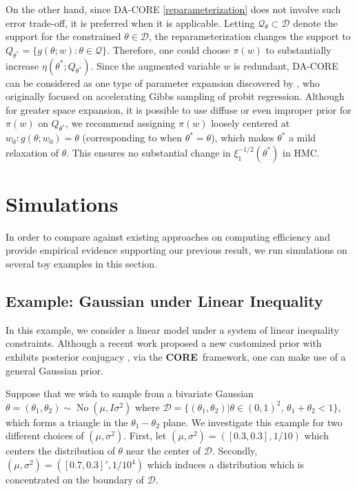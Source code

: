 \documentclass[10pt,fleqn]{article}
\newcommand{\core}{\textbf{CORE}}
\newcommand{\mc}[1]{\mathcal{#1}}
\DeclareMathOperator{\No}{No}
\DeclareMathOperator{\1}{\mathbbm{1}}
\begin{document}
On the other hand, since DA-CORE \eqref{reparameterization} does not involve such error trade-off, it is preferred when it is applicable. Letting $\mc Q_\theta\subset \mc D$ denote the support for the constrained $\theta\in \mc D$, the reparameterization changes the support to $Q_{\theta^*}=\{g(\theta;w):\theta\in \mc Q\}$. Therefore, one could choose $\pi(w)$ to substantially increase $\eta(\theta^*; Q_{\theta^*})$.
Since the augmented variable $w$ is redundant, DA-CORE can
be considered as one type of parameter expansion  discovered by \cite{liu1999parameter}, who originally
focused on accelerating  Gibbs sampling of probit regression. 
Although for
greater space expansion,  it is possible to use diffuse or even improper prior for $\pi(w)$ on $Q_{\theta^*}$,
 we recommend assigning $\pi(w)$ loosely centered at $w_0:g(\theta;w_0)=\theta$ (corresponding to when $\theta^*=\theta$), which makes $\theta^*$ a mild relaxation of $\theta$. This ensures no substantial change in $\xi^{-1/2}_1(\theta^*)$ in HMC.

\section{Simulations}
In order to compare against existing approaches on computing efficiency and provide empirical evidence
supporting our previous result, we run simulations on several toy examples
 in this section.
   
\subsection{Example: Gaussian  under Linear Inequality}
\label{SEC:Gaussian_Triangle_Constraint_Sampling}
In this example, we consider a linear model under a system of linear inequality constraints. Although a
recent work proposed a new customized prior with exhibits posterior conjugacy \citep{danaher2012minkowski},
via the \core\, framework, one can make use of a general Gaussian prior. 

Suppose that we wish to sample from a bivariate Gaussian $\theta=(\theta_1,\theta_2) \sim \No \left( \mu, I\sigma^2\right)$ where $\mathcal{D}=\{(\theta_1,\theta_2) |\theta\in(0,1)^2, \, \theta_1+\theta_2<1\}$,
which forms a triangle in the $\theta_1-\theta_2$ plane.  We investigate this example for two different choices of $(\mu,\sigma^2)$. First, let $(\mu, \sigma^2)=([0.3,0.3],1/{10})$  which centers the distribution of $\theta$ near the center of $\mc D$. Secondly,  $(\mu,\sigma^2) = ([0.7,0.3]',1/10^4)$  which induces a  distribution which is concentrated on the boundary of $\mc D$. 
\end{document}
